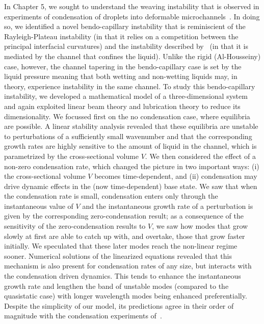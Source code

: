 In Chapter 5, we sought to understand the weaving instability that is observed in experiments of condensation of droplets into deformable microchannels~\citep{Seemann2011JPhysCondMat}. In doing so, we identified a novel bendo-capillary instability that is reminiscient of the Rayleigh-Plateau instability (in that it relies on a competition between the principal interfacial curvatures) and the instability described by~\cite{AlHousseiny2012NaturePhysics} (in that it is mediated by the channel that confines the liquid). Unlike the rigid (Al-Housseiny) case, however, the channel tapering in the bendo-capillary case is set by the liquid pressure meaning that both wetting and non-wetting liquids may, in theory, experience instability in the same channel. To study this bendo-capillary instability, we developed a mathematical model of a three-dimensional system and again exploited linear beam theory and lubrication theory to reduce its dimensionality. We focussed first on the no condensation case, where equilibria are possible. A linear stability analysis revealed that these equilibria are unstable to perturbations of a sufficiently small wavenumber and that the corresponding growth rates are highly sensitive to the amount of liquid in the channel, which is parametrized by the cross-sectional volume $V$. We then considered the effect of a non-zero condensation rate, which changed the picture in two important ways: (i) the cross-sectional volume $V$ becomes time-dependent, and (ii) condensation may drive dynamic effects in the (now time-dependent) base state. We saw that when the condensation rate is small, condensation enters only through the instantaneous value of $V$ and the instantaneous growth rate of a perturbation is given by the corresponding zero-condensation result; as a consequence of the sensitivity of the zero-condensation results to $V$, we saw how modes that grow slowly at first are able to catch up with, and overtake, those that grow faster initially. We speculated that these later modes reach the non-linear regime sooner. Numerical solutions of the linearized equations revealed that this mechanism is also present for condensation rates of any size, but interacts with the condensation driven dynamics. This tends to enhance the instantaneous growth rate and lengthen the band of unstable modes (compared to the quasistatic case) with longer wavelength modes being enhanced preferentially. Despite the simplicity of our model, its predictions agree in their order of magnitude with the condensation experiments of~\cite{Seemann2011JPhysCondMat}.

